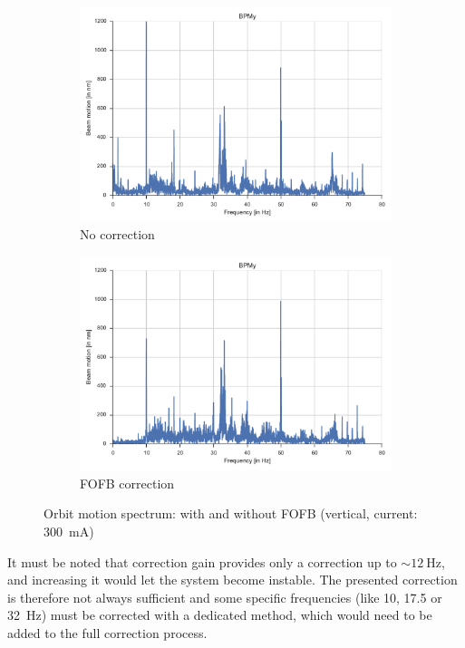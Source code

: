 \begin{figure}
    \centering
    \begin{subfigure}[b]{0.8\textwidth}
        \includegraphics[width=\linewidth]{img/fft_no_corr}
        \caption{No correction}
    \end{subfigure}
    
    \begin{subfigure}[b]{0.8\textwidth}
        \includegraphics[width=\linewidth]{img/fft_fofb}
        \caption{FOFB correction}
    \end{subfigure}
    \caption{\label{fig:compare_fofb}Orbit motion spectrum: with and without FOFB (vertical, current: \SI{300}{\milli\ampere})}
\end{figure}

It must be noted that correction gain provides only a correction up to $\sim\!\SI{12}{\hertz}$, and increasing it would let the system become instable. The presented correction is therefore not always sufficient and some specific frequencies (like 10, 17.5 or \SI{32}{\hertz}) must be corrected with a dedicated method, which would need to be added to the full correction process.

